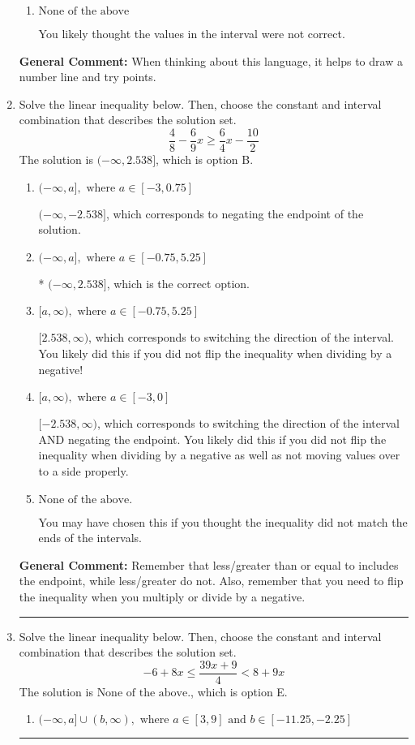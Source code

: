 \documentclass{extbook}[14pt]
\newcommand{\litem}[1]{\item #1

\rule{\textwidth}{0.4pt}}
\begin{document}
\begin{enumerate}
{\begin{enumerate}[label=\Alph*.]
This describes the values no less than 5 from 1
\item \( \text{None of the above} \)

You likely thought the values in the interval were not correct.
\end{enumerate}

\textbf{General Comment:} When thinking about this language, it helps to draw a number line and try points.
}
\litem{
Solve the linear inequality below. Then, choose the constant and interval combination that describes the solution set.
\[ \frac{4}{8} - \frac{6}{9} x \geq \frac{6}{4} x - \frac{10}{2} \]The solution is \( (-\infty, 2.538] \), which is option B.\begin{enumerate}[label=\Alph*.]
\item \( (-\infty, a], \text{ where } a \in [-3, 0.75] \)

 $(-\infty, -2.538]$, which corresponds to negating the endpoint of the solution.
\item \( (-\infty, a], \text{ where } a \in [-0.75, 5.25] \)

* $(-\infty, 2.538]$, which is the correct option.
\item \( [a, \infty), \text{ where } a \in [-0.75, 5.25] \)

 $[2.538, \infty)$, which corresponds to switching the direction of the interval. You likely did this if you did not flip the inequality when dividing by a negative!
\item \( [a, \infty), \text{ where } a \in [-3, 0] \)

 $[-2.538, \infty)$, which corresponds to switching the direction of the interval AND negating the endpoint. You likely did this if you did not flip the inequality when dividing by a negative as well as not moving values over to a side properly.
\item \( \text{None of the above}. \)

You may have chosen this if you thought the inequality did not match the ends of the intervals.
\end{enumerate}

\textbf{General Comment:} Remember that less/greater than or equal to includes the endpoint, while less/greater do not. Also, remember that you need to flip the inequality when you multiply or divide by a negative.
}
\litem{
Solve the linear inequality below. Then, choose the constant and interval combination that describes the solution set.
\[ -6 + 8 x \leq \frac{39 x + 9}{4} < 8 + 9 x \]The solution is \( \text{None of the above.} \), which is option E.\begin{enumerate}[label=\Alph*.]
\item \( (-\infty, a] \cup (b, \infty), \text{ where } a \in [3, 9] \text{ and } b \in [-11.25, -2.25] \)


\end{enumerate}}
\end{enumerate}
\end{document}
